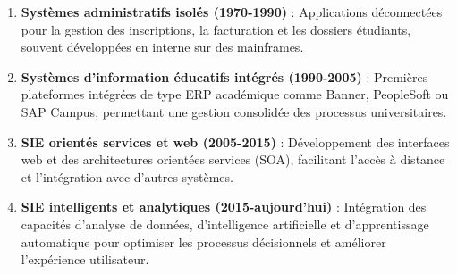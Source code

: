 \documentclass[french,12pt]{report} %
\let\oldfigure\figure
\let\endoldfigure\endfigure
\renewenvironment{figure}[1][H]{
    \oldfigure[#1]\centering
}{
    \endoldfigure
}
\begin{document}
\begin{figure}[H]
\begin{mdframed}[style=figstyle]
\centering
{}
\end{mdframed}
\caption{Évolution des systèmes d'information académiques}
\label{fig:evolution-sie}
\end{figure}

\begin{enumerate}
    \item \textbf{Systèmes administratifs isolés (1970-1990)} : Applications déconnectées pour la gestion des inscriptions, la facturation et les dossiers étudiants, souvent développées en interne sur des mainframes.
    
    \item \textbf{Systèmes d'information éducatifs intégrés (1990-2005)} : Premières plateformes intégrées de type ERP académique comme Banner, PeopleSoft ou SAP Campus, permettant une gestion consolidée des processus universitaires.
    
    \item \textbf{SIE orientés services et web (2005-2015)} : Développement des interfaces web et des architectures orientées services (SOA), facilitant l'accès à distance et l'intégration avec d'autres systèmes.
    
    \item \textbf{SIE intelligents et analytiques (2015-aujourd'hui)} : Intégration des capacités d'analyse de données, d'intelligence artificielle et d'apprentissage automatique pour optimiser les processus décisionnels et améliorer l'expérience utilisateur.
\end{enumerate}
\end{document}
